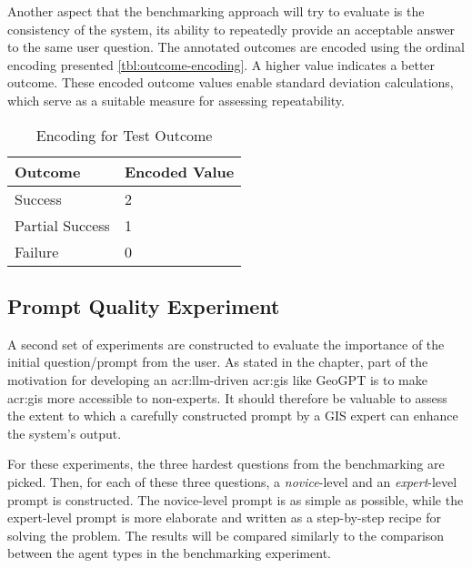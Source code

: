 Another aspect that the benchmarking approach will try to evaluate is the consistency of the system, its ability to repeatedly provide an acceptable answer to the same user question. The annotated outcomes are encoded using the ordinal encoding presented \autoref{tbl:outcome-encoding}. A higher value indicates a better outcome. These encoded outcome values enable standard deviation calculations, which serve as a suitable measure for assessing repeatability.

\begin{table}[htbp]
    \centering
    \caption{Encoding for Test Outcome}
    \label{tbl:outcome-encoding}
    \begin{tabularx}{0.5\textwidth}{XX}
        \toprule
        \textbf{Outcome} & \textbf{Encoded Value} \\
        \midrule
        Success          & 2                      \\
        Partial Success  & 1                      \\
        Failure          & 0                      \\
        \bottomrule
    \end{tabularx}
\end{table}


\subsection{Prompt Quality Experiment}
\label{subsec:prompt-quality-test-setup}

A second set of experiments are constructed to evaluate the importance of the initial question/prompt from the user. As stated in the  chapter, part of the motivation for developing an \acrshort{acr:llm}-driven \acrshort{acr:gis} like GeoGPT is to make \acrshort{acr:gis} more accessible to non-experts. It should therefore be valuable to assess the extent to which a carefully constructed prompt by a GIS expert can enhance the system's output.

For these experiments, the three hardest questions from the benchmarking are picked. Then, for each of these three questions, a \textit{novice}-level and an \textit{expert}-level prompt is constructed. The novice-level prompt is as simple as possible, while the expert-level prompt is more elaborate and written as a step-by-step recipe for solving the problem. The results will be compared similarly to the comparison between the agent types in the benchmarking experiment.

